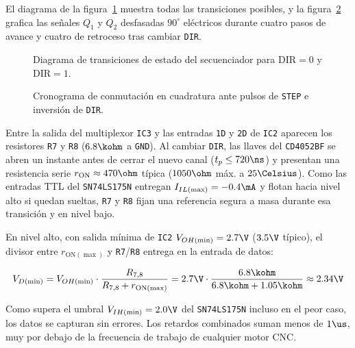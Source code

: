 El diagrama de la figura~\ref{fig.ej3:fsm_pasos} muestra todas las transiciones posibles, y la
figura~\ref{fig.ej3:cronograma_pasos} grafica las señales $Q_1$ y $Q_2$ desfasadas $90^\circ$ eléctricos durante
cuatro pasos de avance y cuatro de retroceso tras cambiar \texttt{DIR}.

\begin{figure}[!ht]
  \centering
  
  \caption{Diagrama de transiciones de estado del secuenciador para $\text{DIR}=0$ y $\text{DIR}=1$.}
  \label{fig.ej3:fsm_pasos}
\end{figure}

\begin{figure}[!ht]
  \centering
  \resizebox{\textwidth}{!}{}
  \caption{Cronograma de conmutación en cuadratura ante pulsos de \texttt{STEP} e inversión de \texttt{DIR}.}
  \label{fig.ej3:cronograma_pasos}
\end{figure}

Entre la salida del multiplexor \texttt{IC3} y las entradas \texttt{1D} y \texttt{2D} de \texttt{IC2} aparecen
los resistores \texttt{R7} y \texttt{R8} ($6.8\kohm$ a \texttt{GND}). Al cambiar \texttt{DIR}, las llaves del
\texttt{CD4052BF} se abren un instante antes de cerrar el nuevo canal ($t_p \le 720\ns$) y presentan una
resistencia serie $r_{\text{ON}} \approx 470\ohm$ típica ($1050\ohm$ máx. a $25\Celsius$). Como las entradas TTL
del \texttt{SN74LS175N} entregan $I_{IL(\max)} = -0.4\mA$ y flotan hacia nivel alto si quedan sueltas,
\texttt{R7} y \texttt{R8} fijan una referencia segura a masa durante esa transición y en nivel bajo.

En nivel alto, con salida mínima de \texttt{IC2} $V_{OH(\min)} = 2.7\V$ ($3.5\V$ típico), el divisor entre
$r_{\text{ON}(\max)}$ y \texttt{R7}/\texttt{R8} entrega en la entrada de datos:

\begin{equation*}
  V_{D(\text{min})} = V_{OH(\min)} \cdot \frac{R_{7,8}}{R_{7,8} + r_{\text{ON}(\max)}}
  = 2.7\V \cdot \frac{6.8\kohm}{6.8\kohm + 1.05\kohm} \approx 2.34\V
\end{equation*}

Como supera el umbral $V_{IH(\min)} = 2.0\V$ del \texttt{SN74LS175N} incluso en el peor caso, los datos se
capturan sin errores. Los retardos combinados suman menos de $1\us$, muy por debajo de la frecuencia de trabajo
de cualquier motor CNC.
